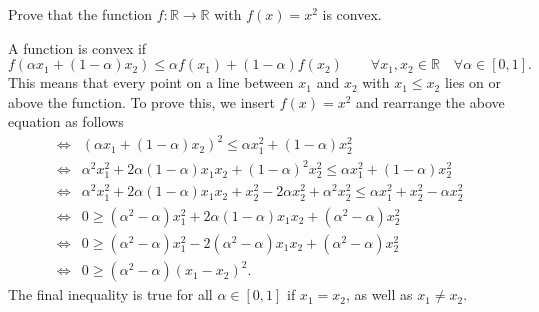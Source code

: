 \documentclass
[answers]
{exercise_sheet}
\begin{document}
\begin{Question}{2}
Prove that the function $f : \mathbb{R} \rightarrow \mathbb{R}$ with $f(x) = x^2$ is convex.
\end{Question}

\makeatletter\if@answers\begin{Answer}{8}

A function is convex if
\begin{equation*}
f(\alpha x_1 + (1-\alpha) x_2) \leq \alpha f(x_1) + (1-\alpha) f(x_2) \qquad \forall x_1,x_2 \in \mathbb{R} \quad \forall \alpha \in [0,1] .
\end{equation*}
This means that every point on a line between $x_1$ and $x_2$ with $x_1 \leq x_2$ lies on or above the function. To prove this, we insert $f(x) = x^2$ and rearrange the above equation as follows
\begin{align*} 
\Leftrightarrow & \left( \alpha x_1 + (1-\alpha) x_2 \right)^2 \leq \alpha x_1^2 + (1-\alpha) x_2^2 \\
\Leftrightarrow & \alpha^2 x_1^2 + 2 \alpha (1-\alpha) x_1 x_2 + (1-\alpha)^2 x_2^2 \leq \alpha x_1^2 + (1-\alpha) x_2^2 \\
\Leftrightarrow & \alpha^2 x_1^2 + 2 \alpha (1-\alpha) x_1 x_2 + x_2^2 - 2 \alpha x_2^2 + \alpha^2 x_2^2 \leq \alpha x_1^2 + x_2^2 - \alpha x_2^2 \\
\Leftrightarrow & 0 \geq (\alpha^2-\alpha) x_1^2 + 2 \alpha (1-\alpha) x_1 x_2 + (\alpha^2-\alpha) x_2^2 \\
\Leftrightarrow & 0 \geq (\alpha^2-\alpha) x_1^2 - 2 (\alpha^2-\alpha) x_1 x_2 + (\alpha^2-\alpha) x_2^2 \\
\Leftrightarrow & 0 \geq (\alpha^2-\alpha) (x_1-x_2)^2 .
\end{align*}
The final inequality is true for all $\alpha \in [0, 1]$ if $x_1=x_2$, as well as $x_1 \neq x_2$.
\end{Answer}\fi\makeatother
\end{document}
